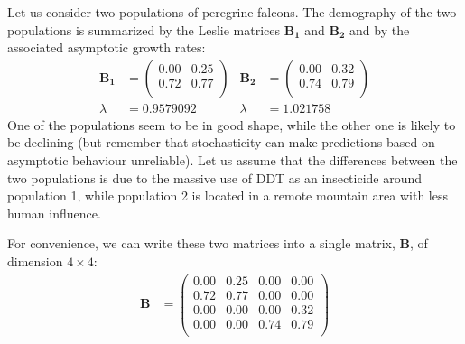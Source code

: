 \documentclass{article}\usepackage[]{graphicx}\usepackage[]{color}
\begin{document}
Let us consider two populations of peregrine falcons. 
The demography of the two populations is summarized by the Leslie matrices $\boldsymbol{B_1}$ and $\boldsymbol{B_2}$ and by the associated asymptotic growth rates:
\begin{align*}\boldsymbol{B_1} &=%
\begin{pmatrix}{}
  0.00 & 0.25 \\ 
  0.72 & 0.77 \\ 
  \end{pmatrix}
& \boldsymbol{B_2} &=%
\begin{pmatrix}{}
  0.00 & 0.32 \\ 
  0.74 & 0.79 \\ 
  \end{pmatrix}
\\ \lambda &= 0.9579092 &\lambda &= 1.021758\end{align*}
One of the populations seem to be in good shape, while the other one is likely to be declining (but remember that stochasticity can make predictions based on asymptotic behaviour unreliable). Let us assume that the differences between the two populations is due to the massive use of DDT as an insecticide around population 1, while population 2 is located in a remote mountain area with less human influence.

For convenience, we can write these two matrices into a single matrix, $\boldsymbol{B}$, of dimension $4\times 4$:
\begin{align*}\boldsymbol{B} &=%
\begin{pmatrix}{}
  0.00 & 0.25 & 0.00 & 0.00 \\ 
  0.72 & 0.77 & 0.00 & 0.00 \\ 
  0.00 & 0.00 & 0.00 & 0.32 \\ 
  0.00 & 0.00 & 0.74 & 0.79 \\ 
  \end{pmatrix}
\end{align*}
\end{document}
